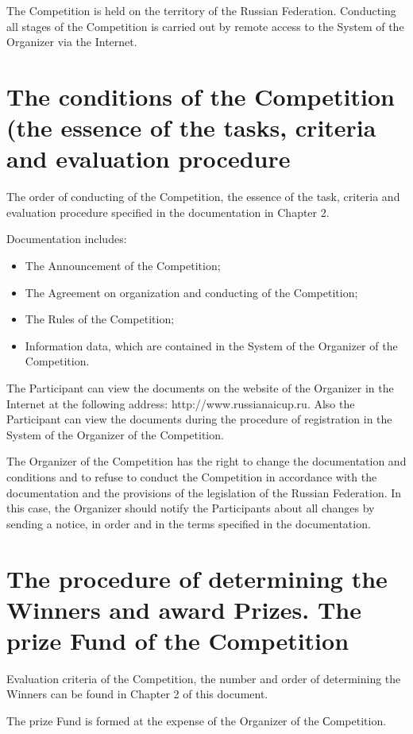 The Competition is held on the territory of the Russian Federation. Conducting all stages of the Competition is carried out
by remote access to the System of the Organizer via the Internet.

\section{The conditions of the Competition (the essence of the tasks, criteria and evaluation procedure}

The order of conducting of the Competition, the essence of the task, criteria and evaluation procedure specified in the
documentation in Chapter 2.

Documentation includes:
\begin{itemize}
\item The Announcement of the Competition;
\item The Agreement on organization and conducting of the Competition;
\item The Rules of the Competition;
\item Information data, which are contained in the System of the Organizer of the Competition.
\end{itemize}

The Participant can view the documents on the website of the Organizer in the Internet at the following address:
http://www.russianaicup.ru. Also the Participant can view the documents during the procedure of registration
in the System of the Organizer of the Competition.

The Organizer of the Competition has the right to change the documentation and conditions and to refuse to conduct
the Competition in accordance with the documentation and the provisions of the legislation of the Russian Federation.
In this case, the Organizer should notify the Participants about all changes by sending a notice,
in order and in the terms specified in the documentation.

\section{The procedure of determining the Winners and award Prizes. The prize Fund of the Competition}

Evaluation criteria of the Competition, the number and order of determining the Winners can be found in Chapter 2 of this document.

The prize Fund is formed at the expense of the Organizer of the Сompetition.

